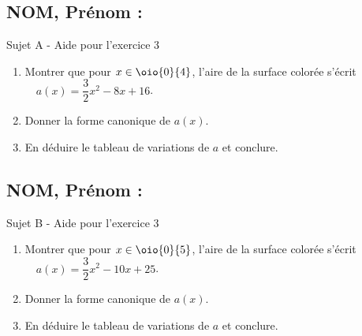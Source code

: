\documentclass[a4paper,11pt,exos]{nsi}
\begin{document}
\subsection*{NOM, Prénom : \dotfill} 
{\titlefont\color{UGLiBlue}\Large Sujet A - Aide pour l'exercice 3}
\begin{enumerate}
    \item Montrer que pour $x\in\oio{0}{4}$, l'aire de la surface colorée s'écrit $\quad a(x)=\dfrac{3}{2}x^2-8x+16$.\\[.5em]
    \item Donner la forme canonique de $a(x)$.\\[.5em]
    \item En déduire le tableau de variations de $a$ et conclure.\\[.5em]
\end{enumerate}


\subsection*{NOM, Prénom : \dotfill} 
{\titlefont\color{UGLiBlue}\Large Sujet B - Aide pour l'exercice 3}
\begin{enumerate}
    \item Montrer que pour $x\in\oio{0}{5}$, l'aire de la surface colorée s'écrit $\quad a(x)=\dfrac{3}{2}x^2-10x+25$.\\[.5em]
    \item Donner la forme canonique de $a(x)$.\\[.5em]
    \item En déduire le tableau de variations de $a$ et conclure.\\[.5em]
\end{enumerate}
\end{document}
